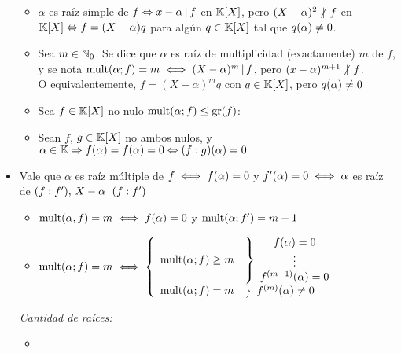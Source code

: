 \begin{itemize}
\begin{itemize}
		      \item $\alpha$ es raíz \underline{simple} de $f \sii x - \alpha \divideA f$ en $\K[X]$,
		            pero $(X - \alpha)^2 \noDivide f$ en $\K[X] \sii f = (X - \alpha) q$
		            para algún $q \en \K[X]$ tal que $q(\alpha) \distinto 0$.

		      \item Sea $m \en \naturales_0$. Se dice que $\alpha$ es raíz de multiplicidad (exactamente)
		            $m$ de $f$, y se nota $\mult{\alpha;f} = m \sisolosi (X - \alpha)^m \divideA f$,
		            pero $(x - \alpha)^{m+1} \noDivide f$.\\
		            O equivalentemente, $f = (X - \alpha)^m q$ con $q \en \K[X]$,
		            pero $q(\alpha) \distinto 0$

		      \item Sea $f \en \K[X]$ no nulo $\mult{\alpha; f} \leq \gr{f}$:

		      \item Sean $f$, $g \en \K[X]$ no ambos nulos, y $\alpha \en \K
			            \entonces f(\alpha) = f(\alpha) = 0 \sii (f:g)(\alpha) = 0$
	      \end{itemize}

	\item Vale que $\alpha$ es raíz múltiple de $f \sisolosi f(\alpha) = 0$ y $f'(\alpha) = 0 \sisolosi \alpha$
	      es raíz de $(f:f'),\, X - \alpha \divideA (f:f')$
	      \begin{itemize}
		      \item $
			            \mult{\alpha,f} = m
			            \sisolosi
			            f(\alpha) = 0$ y $\mult{\alpha;f'} = m-1$

		      \item $\mult{\alpha;f} = m \sisolosi
			            \llave{rl}{
				            \mult{\alpha;f}\geq m     &
				            \llaveInv{c}{
					            f(\alpha) = 0\\
					            \vdots\\
                                f^{(m-1)}(\alpha) = 0
				            }\\
				            \mult{\alpha;f} = m     &
				            \llaveInv{c}{
                              f^{(m)}(\alpha) \distinto 0
				            }
			            }$
	      \end{itemize}

          \textit{Cantidad de raíces: }
          \begin{itemize}
            \item 
          \end{itemize}
\end{itemize}
